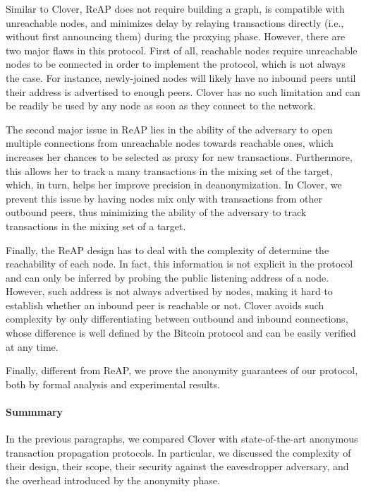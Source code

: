 \documentclass{article}
\begin{document}
	Similar to Clover, ReAP does not require building a graph, is compatible with unreachable nodes, and minimizes delay by relaying transactions directly (i.e., without first announcing them) during the proxying phase.
	However, there are two major flaws in this protocol.
	First of all, reachable nodes require unreachable nodes to be connected in order to implement the protocol, which is not always the case. For instance, newly-joined nodes will likely have no inbound peers until their address is advertised to enough peers.
	Clover has no such limitation and can be readily be used by any node as soon as they connect to the network.
	
	The second major issue in ReAP lies in the ability of the adversary to open multiple connections from unreachable nodes towards reachable ones, which increases her chances to be selected as proxy for new transactions.
	Furthermore, this allows her to track a many transactions in the mixing set of the target, which, in turn, helps her improve precision in deanonymization.
	In Clover, we prevent this issue by having nodes mix only with transactions from other outbound peers, thus minimizing the ability of the adversary to track transactions in the mixing set of a target.
	
	Finally, the ReAP design has to deal with the complexity of determine the reachability of each node.
	In fact, this information is not explicit in the protocol and can only be inferred by probing the public listening address of a node.
	However, such address is not always advertised by nodes, making it hard to establish whether an inbound peer is reachable or not.
	Clover avoids such complexity by only differentiating between outbound and inbound connections, whose difference is well defined by the Bitcoin protocol and can be easily verified at any time.
	
	Finally, different from ReAP, we prove the anonymity guarantees of our protocol, both by formal analysis and experimental results.
	
	\paragraph{Summmary}
	In the previous paragraphs,  
	we compared Clover with state-of-the-art anonymous transaction propagation protocols.
	In particular, we discussed the complexity of their design, their scope, their security against the eavesdropper adversary, and the overhead introduced by the anonymity phase.
	
\end{document}
